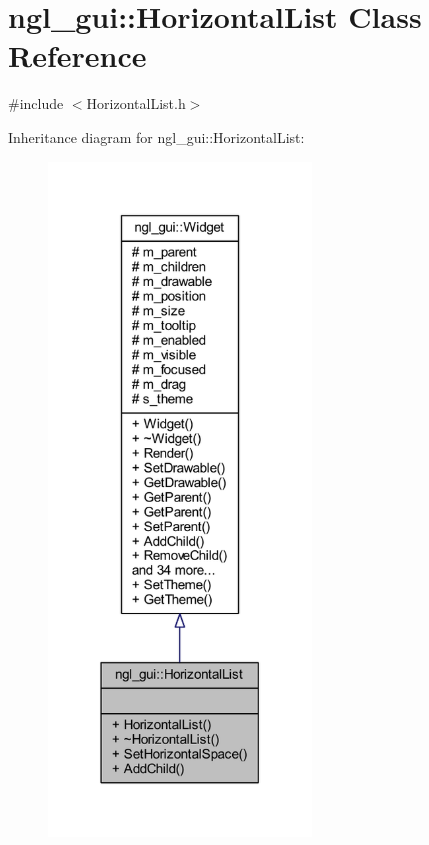 \hypertarget{classngl__gui_1_1_horizontal_list}{}\section{ngl\+\_\+gui\+:\+:Horizontal\+List Class Reference}
\label{classngl__gui_1_1_horizontal_list}


{\ttfamily \#include $<$Horizontal\+List.\+h$>$}



Inheritance diagram for ngl\+\_\+gui\+:\+:Horizontal\+List\+:\nopagebreak
\begin{figure}[H]
\begin{center}
\leavevmode
\includegraphics[width=198pt]{classngl__gui_1_1_horizontal_list__inherit__graph}
\end{center}
\end{figure}


